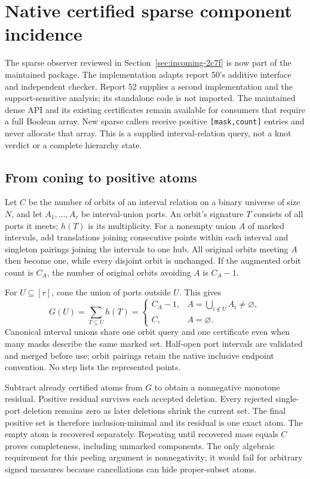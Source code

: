 \section{Native certified sparse component incidence}
\label{sec:sparse-incidence}

The sparse observer reviewed in Section~\ref{sec:incoming-2c7f} is now part
of the maintained  package. The implementation adapts report
50's additive interface and independent checker. Report 52 supplies a second
implementation and the support-sensitive analysis; its standalone code is
not imported. The maintained dense API and its existing certificates remain
available for consumers that require a full Boolean array. New sparse callers
receive positive \texttt{[mask,count]} entries and never allocate that array.
This is a supplied interval-relation query, not a knot verdict or a complete
hierarchy state.

\subsection{From coning to positive atoms}

Let $C$ be the number of orbits of an interval relation on a binary universe
of size $N$, and let $A_1,\ldots,A_r$ be interval-union ports. An orbit's
signature $T$ consists of all ports it meets; $h(T)$ is its multiplicity.
For a nonempty union $A$ of marked intervals, add translations joining
consecutive points within each interval and singleton pairings joining the
intervals to one hub. All original orbits meeting $A$ then become one,
while every disjoint orbit is unchanged. If the augmented orbit count is
$C_A$, the number of original orbits avoiding $A$ is $C_A-1$.

For $U\subseteq[r]$, cone the union of ports outside $U$. This gives
\[
 G(U)=\sum_{T\subseteq U}h(T)=
 \begin{cases}C_A-1,&A=\bigcup_{i\notin U}A_i\ne\varnothing,\\
 C,&A=\varnothing.
 \end{cases}
\]
Canonical interval unions share one orbit query and one certificate even
when many masks describe the same marked set. Half-open port intervals are
validated and merged before use; orbit pairings retain the native inclusive
endpoint convention. No step lists the represented points.

Subtract already certified atoms from $G$ to obtain a nonnegative monotone
residual. Positive residual survives each accepted deletion. Every rejected
single-port deletion remains zero as later deletions shrink the current set.
The final positive set is therefore inclusion-minimal and its residual is
one exact atom. The empty atom is recovered separately. Repeating until
recovered mass equals $C$ proves completeness, including unmarked components.
The only algebraic requirement for this peeling argument is nonnegativity;
it would fail for arbitrary signed measures because cancellations can hide
proper-subset atoms.

